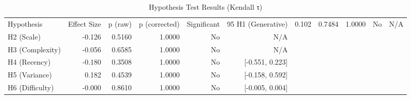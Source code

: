 \begin{table}
\caption{Hypothesis Test Results (Kendall τ)}
\label{tab:results_kendall}
\begin{tabular}{lrrrrr}
\toprule
Hypothesis & Effect Size & p (raw) & p (corrected) & Significant & 95%
\midrule
H1 (Generative) & 0.102 & 0.7484 & 1.0000 & No & N/A \\
H2 (Scale) & -0.126 & 0.5160 & 1.0000 & No & N/A \\
H3 (Complexity) & -0.056 & 0.6585 & 1.0000 & No & N/A \\
H4 (Recency) & -0.180 & 0.3508 & 1.0000 & No & [-0.551, 0.223] \\
H5 (Variance) & 0.182 & 0.4539 & 1.0000 & No & [-0.158, 0.592] \\
H6 (Difficulty) & -0.000 & 0.8610 & 1.0000 & No & [-0.005, 0.004] \\
\bottomrule
\end{tabular}
\end{table}
